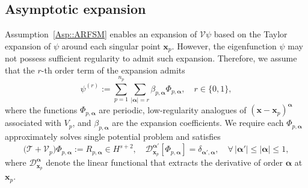 \documentclass{sn-jnl}%
\numberwithin{equation}{section}
\theoremstyle{thmstyleone}%
\theoremstyle{thmstyletwo}%
\theoremstyle{thmstylethree}%
\begin{document}
\subsection{Asymptotic expansion} 
Assumption~\ref{Asp::ARFSM} enables an expansion of $\mathcal{V}\psi$ based on the Taylor expansion of $\psi$ around each singular point $\bm x_p$. However, the eigenfunction $\psi$ may not possess sufficient regularity to admit such expansion. Therefore, we assume that the $r$-th order term of the expansion admits
\begin{equation}\label{Eq-2.2-01}
    \psi^{(r)} := \sum_{p=1}^{n_p}\sum_{|\bm \alpha|=r} \beta_{p,\bm \alpha}\Phi_{p,\bm \alpha},\quad r\in\{0,1\},
\end{equation}
where the functions $\Phi_{p,\bm \alpha}$ are periodic, low-regularity analogues of $(\bm x - \bm x_p)^{\bm \alpha}$ associated with $V_p$, and $\beta_{p,\bm \alpha}$ are the expansion coefficients. We require each $\Phi_{p,\bm \alpha}$ approximately solves single potential problem and satisfies
\begin{equation}
\label{Eq-2.2-02}
    \bigl(\mathcal{T}+\mathcal{V}_p\bigr)\Phi_{p,\bm\alpha} :=
    R_{p,\bm \alpha}\in H^{s+2},\quad
    \mathcal{D}^{\bm \alpha'}_{\bm x_p} [\Phi_{p,\bm \alpha}] = \delta_{\bm \alpha',\bm \alpha},\quad
    \forall\, |\bm \alpha'|\leq |\bm \alpha|\leq 1,
\end{equation}
where $\mathcal{D}^{\bm \alpha}_{\bm x_p}$ denote the linear functional that extracts the derivative of order $\bm \alpha$ at $\bm x_p$.
\end{document}

